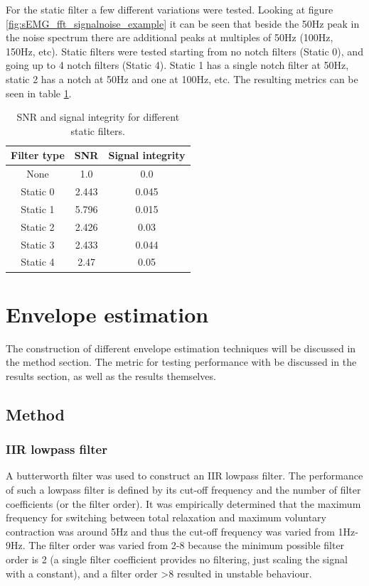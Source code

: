 For the static filter a few different variations were tested. Looking at figure \ref{fig:sEMG_fft_signalnoise_example} it can be seen that beside the 50Hz peak in the noise spectrum there are additional peaks at multiples of 50Hz (100Hz, 150Hz, etc). Static filters were tested starting from no notch filters (Static 0), and going up to 4 notch filters (Static 4). Static 1 has a single notch filter at 50Hz, static 2 has a notch at 50Hz and one at 100Hz, etc. The resulting metrics can be seen in table \ref{tab:static_filter_snr_integrity}.

\begin{table} [h!]
    \begin{tabular}{c|c|c}
        Filter type & SNR & Signal integrity\\
        \hline
        None & 1.0 & 0.0\\
        Static 0 & 2.443 & 0.045\\
        Static 1 & 5.796 & 0.015\\
        Static 2 & 2.426 & 0.03\\
        Static 3 & 2.433 & 0.044\\
        Static 4 & 2.47 & 0.05\\
    \end{tabular}
    \caption{SNR and signal integrity for different static filters.}
    \label{tab:static_filter_snr_integrity}
\end{table}

\section{Envelope estimation}
The construction of different envelope estimation techniques will be discussed in the method section. The metric for testing performance with be discussed in the results section, as well as the results themselves.

\subsection{Method}
\subsubsection{IIR lowpass filter}
A butterworth filter was used to construct an IIR lowpass filter. The performance of such a lowpass filter is defined by its cut-off frequency and the number of filter coefficients (or the filter order). It was empirically determined that the maximum frequency for switching between total relaxation and maximum voluntary contraction was around 5Hz and thus the cut-off frequency was varied from 1Hz-9Hz. The filter order was varied from 2-8 because the minimum possible filter order is 2 (a single filter coefficient provides no filtering, just scaling the signal with a constant), and a filter order >8 resulted in unstable behaviour.

